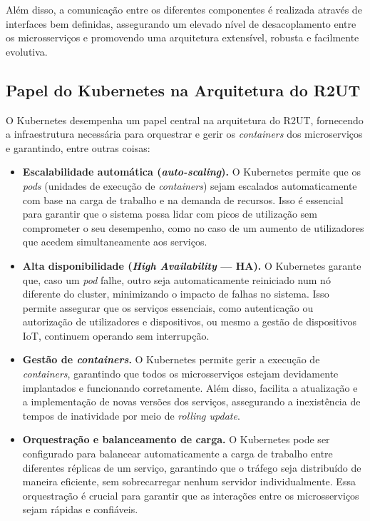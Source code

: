 Além disso, a comunicação entre os diferentes componentes é realizada através de interfaces bem definidas, assegurando um elevado nível de desacoplamento entre os microsserviços e promovendo uma arquitetura extensível, robusta e facilmente evolutiva.


\subsection{Papel do Kubernetes na Arquitetura do R2UT}

O Kubernetes desempenha um papel central na arquitetura do R2UT, fornecendo a infraestrutura necessária para orquestrar e gerir os \textit{containers} dos microserviços e garantindo, entre outras coisas:

\begin{itemize}
    \item \textbf{Escalabilidade automática (\textit{auto-scaling}).} O Kubernetes permite que os \textit{pods} (unidades de execução de \textit{containers}) sejam escalados automaticamente com base na carga de trabalho e na demanda de recursos. Isso é essencial para garantir que o sistema possa lidar com picos de utilização sem comprometer o seu desempenho, como no caso de um aumento de utilizadores que acedem simultaneamente aos serviços.

    \item \textbf{Alta disponibilidade (\textit{High Availability} — HA).} O Kubernetes garante que, caso um \textit{pod} falhe, outro seja automaticamente reiniciado num nó diferente do cluster, minimizando o impacto de falhas no sistema. Isso permite assegurar que os serviços essenciais, como autenticação ou autorização de utilizadores e dispositivos, ou mesmo a gestão de dispositivos IoT, continuem operando sem interrupção.

    \item \textbf{Gestão de \textit{containers}.} O Kubernetes permite gerir a execução de \textit{containers}, garantindo que todos os microsserviços estejam devidamente implantados e funcionando corretamente. Além disso, facilita a atualização e a implementação de novas versões dos serviços, assegurando a inexistência de tempos de inatividade por meio de \textit{rolling update}.

    \item \textbf{Orquestração e balanceamento de carga.} O Kubernetes pode ser configurado para balancear automaticamente a carga de trabalho entre diferentes réplicas de um serviço, garantindo que o tráfego seja distribuído de maneira eficiente, sem sobrecarregar nenhum servidor individualmente. Essa orquestração é crucial para garantir que as interações entre os microsserviços sejam rápidas e confiáveis.
\end{itemize}



